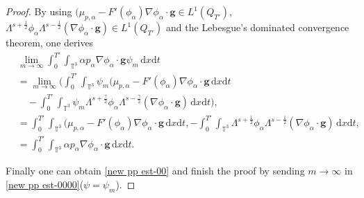 \documentclass[reqno,a4paper,11pt]{amsart}
\theoremstyle{plain}
\numberwithin{equation}{section}
\newcommand{\bg}{\mathbf{g}}
\renewcommand{\d}{\mathrm{d}}
\newcommand{\dx}{\d x}
\newcommand{\dt}{\d t}
\begin{document}
\begin{proof}
					By using  $(\mu_{p,\alpha}-F'(\phi_{\alpha})\nabla\phi_{\alpha}\cdot \bg\in L^{1}(Q_{T'})$, $\Lambda^{s+\frac{1}{2}}\phi_{\alpha}\Lambda^{s-\frac{1}{2}}(\nabla\phi_{\alpha}\cdot\bg)\in L^{1}(Q_{T'})$ and the Lebesgue's dominated convergence theorem,
					one derives
					\begin{align}\label{Leb}
						\nonumber&\lim_{m\to\infty}\int_0^{T'}\int_{\mathbb{T}^{3}} \alpha p_{\alpha}\nabla\phi_{\alpha}\cdot \bg\psi_{m}\,\dx\dt&
						\nonumber\\&=\lim_{m\to\infty}\big(\int_0^{T'}\int_{\mathbb{T}^{3}}\psi_{m}(\mu_{p,\alpha}-F'(\phi_{\alpha})\nabla\phi_{\alpha}\cdot \bg\,\dx\dt
						\nonumber\\&\quad-\int_0^{T'}\int_{\mathbb{T}^{3}}\psi_{m}\Lambda^{s+\frac{\gamma}{2}}\phi_{\alpha}\Lambda^{s-\frac{\gamma}{2}}(\nabla\phi_{\alpha}\cdot\bg)\,\dx\dt \big),
						\nonumber\\&=\int_0^{T'}\int_{\mathbb{T}^{3}}(\mu_{p,\alpha}-F'(\phi_{\alpha})\nabla\phi_{\alpha}\cdot \bg\,\dx\dt,
						-\int_0^{T'}\int_{\mathbb{T}^{3}}\Lambda^{s+\frac{1}{2}}\phi_{\alpha}\Lambda^{s-\frac{1}{2}}(\nabla\phi_{\alpha}\cdot\bg)\,\dx\dt,
						\nonumber\\&=\int_0^{T'}\int_{\mathbb{T}^{3}} \alpha p_{\alpha}\nabla\phi_{\alpha}\cdot \bg\,\dx\dt.
					\end{align}
					
					
					Finally one can obtain \eqref{new pp est-00}  and  finish the proof by sending $m\to\infty$ in \eqref{new pp est-0000}($\psi=\psi_{m}$).
				\end{proof}
				
\end{document}
